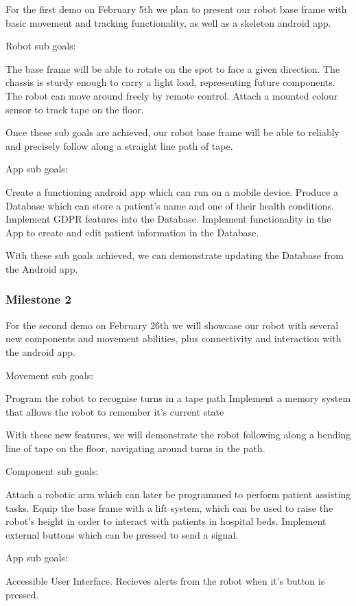 \documentclass{article}
\begin{document}
For the first demo on February 5th we plan to present our robot base frame with basic movement and tracking functionality, as well as a skeleton android app.

Robot sub goals:

The base frame will be able to rotate on the spot to face a given direction.
The chassis is sturdy enough to carry a light load, representing future components.
The robot can move around freely by remote control.
Attach a mounted colour sensor to track tape on the floor.  

Once these sub goals are achieved, our robot base frame will be able to reliably and precisely follow along a straight line path of tape. 

App sub goals:

Create a functioning android app which can run on a mobile device.
Produce a Database which can store a patient's name and one of their health conditions.
Implement GDPR features into the Database.
Implement functionality in the App to create and edit patient information in the Database.

With these sub goals achieved, we can demonstrate updating the Database from the Android app.

\subsubsection{Milestone 2}

For the second demo on February 26th we will showcase our robot with several new components and movement abilities, plus connectivity and interaction with the android app.  

Movement sub goals:

Program the robot to recognise turns in a tape path
Implement a memory system that allows the robot to remember it's current state 

With these new features, we will demonstrate the robot following along a bending line of tape on the floor, navigating around turns in the path.

Component sub goals:

Attach a robotic arm which can later be programmed to perform patient assisting tasks.
Equip the base frame with a lift system, which can be used to raise the robot's height in order to interact with patients in hospital beds.
Implement external buttons which can be pressed to send a signal.


App sub goals:

Accessible User Interface.
Recieves alerts from the robot when it's button is pressed.
\end{document}
